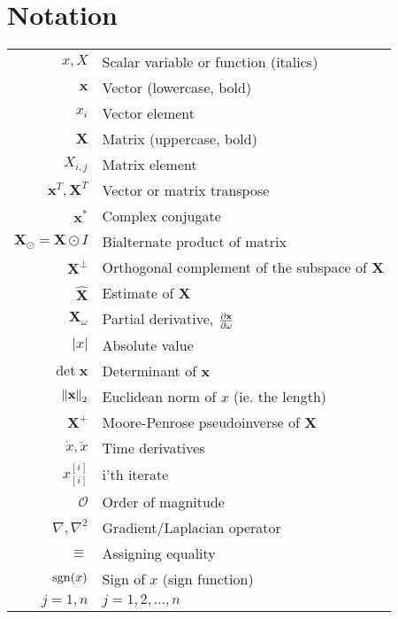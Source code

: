 
\chapter*{Notation}
\label{chap:notation}

\begin{center}
\begin{tabular}{r l}
  \hline
  $x, X$ & Scalar variable or function (italics) \\
  $\bm x$ & Vector (lowercase, bold) \\
  $x_i$ & Vector element \\
  $\bm X$ & Matrix (uppercase, bold) \\
  $X_{i,j}$ & Matrix element \\
  $\bm x^T, \bm X^T$ & Vector or matrix transpose \\
  $\bm x^*$ & Complex conjugate \\
  $\bm X_\odot = \bm X \odot I$ & Bialternate product of matrix \\
  $\bm X^\perp$ & Orthogonal complement of the subspace of $\bm X$ \\
  $\hat {\bm X}$ & Estimate of $\bm X$ \\
  $\bm X_\omega$ & Partial derivative, $\frac{\p \bm x}{\p \omega}$ \\
  $|x|$ & Absolute value \\
  $\det \bm x$ & Determinant of $\bm x$ \\
  $\norm{\bm x}_2$ & Euclidean norm of $x$ (ie. the length) \\
  $\bm X^+$ &  Moore-Penrose pseudoinverse of $\bm X$ \\
  $\dot x, \ddot x$ & Time derivatives \\
  $x^{[i]}_{[i]}$ & i'th iterate \\
  $\mathcal{O}$ & Order of magnitude \\
  $\nabla, \nabla^2$ & Gradient/Laplacian operator \\
  $\equiv$ & Assigning equality \\
  $\operatorname{sgn}(x)$ & Sign of $x$ (sign function) \\
  $j=1,n$ & $j=1,2,...,n$ \\
  \hline
\end{tabular}
\end{center}

